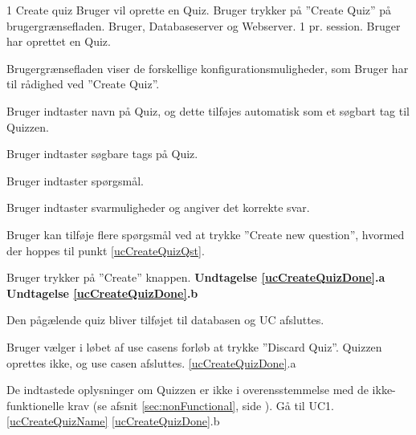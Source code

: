 
\uchead
	{1}
	{Create quiz}
	{Bruger vil oprette en Quiz.}
	{Bruger trykker på ''Create Quiz'' på brugergrænsefladen.}
	{Bruger, Databaseserver og Webserver.}
	{}
	{1 pr. session.}
	{Bruger har oprettet en Quiz.}

\item Brugergrænsefladen viser de forskellige konfigurationsmuligheder, som Bruger har til rådighed ved ''Create Quiz''.

\item \label{ucCreateQuizName} Bruger indtaster navn på Quiz, og dette tilføjes automatisk som et søgbart tag til Quizzen.

\item Bruger indtaster søgbare tags på Quiz.

\item \label{ucCreateQuizQst} Bruger indtaster spørgsmål.

\item Bruger indtaster svarmuligheder og angiver det korrekte svar.

\item Bruger kan tilføje flere spørgsmål ved at trykke ''Create new question'', hvormed der hoppes til punkt \ref{ucCreateQuizQst}.

\item \label{ucCreateQuizDone} Bruger trykker på ''Create'' knappen.
\textbf{Undtagelse \ref{ucCreateQuizDone}.a} \textbf{Undtagelse \ref{ucCreateQuizDone}.b}

\item \label{ucCreateQuizDB} Den pågælende quiz bliver tilføjet til databasen og UC afsluttes.

\ucdescriptionend

\ucextension
	{Bruger vælger i løbet af use casens forløb at trykke ''Discard Quiz''.}
	{Quizzen oprettes ikke, og use casen afsluttes.}
	{\ref{ucCreateQuizDone}.a}
	
\ucextension
	{De indtastede oplysninger om Quizzen er ikke i overensstemmelse med de ikke-funktionelle krav (se afsnit \ref{sec:nonFunctional}, side \pageref{sec:nonFunctional}).}
	{Gå til UC1.\ref{ucCreateQuizName}}
	{\ref{ucCreateQuizDone}.b}
		
